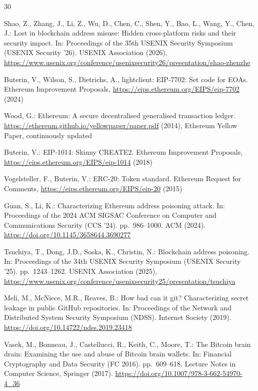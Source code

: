 \documentclass[runningheads]{llncs}
\begin{document}
\begin{thebibliography}{30}

Shao, Z., Zhang, J., Li, Z., Wu, D., Chen, C., Shen, Y., Bao, L., Wang, Y., Chen, J.: Lost in blockchain address misuse: Hidden cross-platform risks and their security impact. In: Proceedings of the 35th USENIX Security Symposium (USENIX Security '26). USENIX Association (2026), \url{https://www.usenix.org/conference/usenixsecurity26/presentation/shao-zhenzhe}

Buterin, V., Wilson, S., Dietrichs, A., lightclient: EIP-7702: Set code for EOAs. Ethereum Improvement Proposals, \url{https://eips.ethereum.org/EIPS/eip-7702} (2024)

Wood, G.: Ethereum: A secure decentralised generalised transaction ledger. \url{https://ethereum.github.io/yellowpaper/paper.pdf} (2014), Ethereum Yellow Paper, continuously updated

Buterin, V.: EIP-1014: Skinny CREATE2. Ethereum Improvement Proposals, \url{https://eips.ethereum.org/EIPS/eip-1014} (2018)

Vogelsteller, F., Buterin, V.: ERC-20: Token standard. Ethereum Request for Comments, \url{https://eips.ethereum.org/EIPS/eip-20} (2015)

Guan, S., Li, K.: Characterizing Ethereum address poisoning attack. In: Proceedings of the 2024 ACM SIGSAC Conference on Computer and Communications Security (CCS '24). pp.~986--1000. ACM (2024). \url{https://doi.org/10.1145/3658644.3690277}

Tsuchiya, T., Dong, J.D., Soska, K., Christin, N.: Blockchain address poisoning. In: Proceedings of the 34th USENIX Security Symposium (USENIX Security '25). pp.~1243--1262. USENIX Association (2025), \url{https://www.usenix.org/conference/usenixsecurity25/presentation/tsuchiya}

Meli, M., McNiece, M.R., Reaves, B.: How bad can it git? Characterizing secret leakage in public GitHub repositories. In: Proceedings of the Network and Distributed System Security Symposium (NDSS). Internet Society (2019). \url{https://doi.org/10.14722/ndss.2019.23418}

Vasek, M., Bonneau, J., Castellucci, R., Keith, C., Moore, T.: The Bitcoin brain drain: Examining the use and abuse of Bitcoin brain wallets. In: Financial Cryptography and Data Security (FC 2016). pp.~609--618. Lecture Notes in Computer Science, Springer (2017). \url{https://doi.org/10.1007/978-3-662-54970-4_36}


\end{thebibliography}
\end{document}
